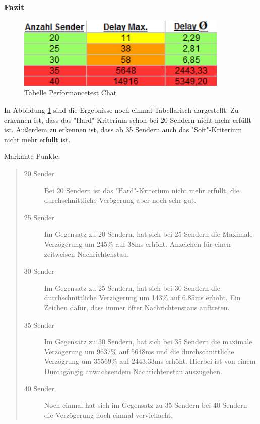 \subsubsection{Fazit}
\begin{figure}[htH]
\centering
\includegraphics[width=0.9\textwidth]{backend/Tabelle_Performance_144hz.PNG}
\caption{Tabelle Performancetest Chat}
\label{backfig19}
\end{figure}
In Abbildung \ref{backfig19} sind die Ergebnisse noch einmal Tabellarisch dargestellt.
Zu erkennen ist, dass das "Hard"-Kriterium schon bei 20 Sendern nicht mehr erfüllt ist.
Außerdem zu erkennen ist, dass ab 35 Sendern auch das "Soft"-Kriterium nicht mehr erfüllt ist.

Markante Punkte:

\begin{quote}
  \begin{description}
  \item[20 Sender]
  Bei 20 Sendern ist das "Hard"-Kriterium nicht mehr erfüllt, die durchschnittliche Verögerung aber noch sehr gut.

  \item[25 Sender]
  Im Gegensatz zu 20 Sendern, hat sich bei 25 Sendern die Maximale Verzögerung um 245\% auf 38ms erhöht. Anzeichen für einen zeitweisen Nachrichtenstau.

  \item[30 Sender]
  Im Gegensatz zu 25 Sendern, hat sich bei 30 Sendern die durchschnittliche Verzögerung um 143\% auf 6.85ms erhöht. Ein Zeichen dafür, dass immer öfter Nachrichtenstaus auftreten.

  \item[35 Sender]
  Im Gegensatz zu 30 Sendern, hat sich bei 35 Sendern die maximale Verzögerung um 9637\% auf 5648ms und die durchschnittliche Verzögrung um 35569\% auf 2443.33ms erhöht. Hierbei ist von einem Durchgängig anwachsendem Nachrichtenstau auszugehen.

  \item[40 Sender]
  Noch einmal hat sich im Gegensatz zu 35 Sendern bei 40 Sendern die Verzögerung noch einmal vervielfacht.
  \end{description}
\end{quote}

